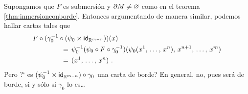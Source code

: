 \begin{obsInmersionConBorde}\label{obs:inmersionconborde}
	Supongamos que $F$ es submersi\'{o}n y $\borde[M]\not =\varnothing$
	como en el teorema \ref{thm:inmersionconborde}. Entonces argumentando
	de manera similar, podemos hallar cartas tales que
	\begin{align*}
		& F\circ (\gamma_{0}^{-1}\circ
			(\psi_{0}\times\id[\bb{R}^{m-n}]))(x) \\
		& \qquad\qquad
			\,=\,\psi_{0}^{-1}(\psi_{0}\circ F\circ\gamma_{0}^{-1})
				(\psi_{0}(\lista*{x}{n}),\,x^{n+1},\,\dots,\,
					x^{m}) \\
		& \qquad\qquad
			\,=\, (\lista*{x}{n})
		\text{ .}
	\end{align*}
	Pero ?` es $(\psi_{0}^{-1}\times\id[\bb{R}^{m-n}])\circ\gamma_{0}$
	una carta de borde? En general, no, pues ser\'{a} de borde, si
	y s\'{o}lo si $\gamma_{0}$ lo es\dots


\end{obsInmersionConBorde}
